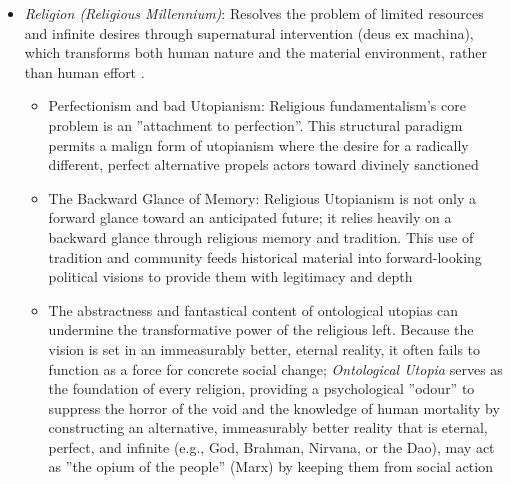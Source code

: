 \documentclass[jou,floatsintext]{apa7}
\begin{document}
\begin{itemize}
\begin{itemize}
\begin{itemize}
        \item[$\rightarrow$] Related theory \textbf{Anarchism}: A political philosophy advocating for a state of spontaneous self-regulation and maximized individual freedom through the dissolution of centralized hierarchies and the state \parencite{bookchinPostScarcityAnarchism1986}; two extreme versions: modern technology has reached a threshold where material want can be eliminated and thereby no more coercive commodity relationships (Abundance, Modern Green) vs. return to non-civilized, hunter-gatherer, or tribal lifestyles (Anarcho-primitivism)
    \end{itemize}
    
    \item \textit{Religion (Religious Millennium)}: Resolves the problem of limited resources and infinite desires through supernatural intervention (deus ex machina), which transforms both human nature and the material environment, rather than human effort \cite{fernandoProfilesIdealSociety2023, kashimaCollectiveFutureThinking2025}.
    \begin{itemize}
        \item Perfectionism and bad Utopianism: Religious fundamentalism's core problem is an ''attachment to perfection''. This structural paradigm permits a malign form of utopianism where the desire for a radically different, perfect alternative propels actors toward divinely sanctioned \parencite{sargissonReligiousFundamentalismUtopianism2007}
        \item The Backward Glance of Memory: Religious Utopianism is not only a forward glance toward an anticipated future; it relies heavily on a backward glance through religious memory and tradition. This use of tradition and community feeds historical material into forward-looking political visions to provide them with legitimacy and depth \parencite{geogheganUtopiaReligionMemory2007}
        \item The abstractness and fantastical content of ontological utopias can undermine the transformative power of the religious left. Because the vision is set in an immeasurably better, eternal reality, it often fails to function as a force for concrete social change; \textit{Ontological Utopia} serves as the foundation of every religion, providing a psychological ''odour'' to suppress the horror of the void and the knowledge of human mortality by constructing an alternative, immeasurably better reality that is eternal, perfect, and infinite (e.g., God, Brahman, Nirvana, or the Dao), may act as ''the opium of the people'' (Marx) by keeping them from social action \parencite{prosicReligiousUtopianismOthering2024}

\end{itemize}
\end{itemize}
\end{itemize}
\end{document}
